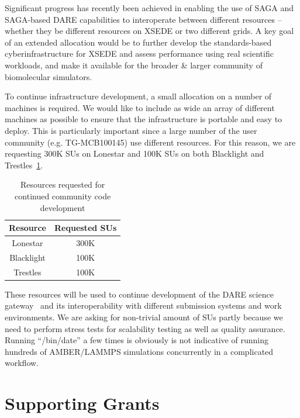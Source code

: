 \documentclass[a4paper,11pt]{article}
\newcommand{\up}{\vspace*{-1em}}
\begin{document}
Significant progress has recently been achieved in enabling the use of SAGA and SAGA-based DARE capabilities to interoperate between different resources -- whether they be different resources on XSEDE or two different grids.  A key goal of an extended allocation would be to further develop the standards-based cyberinfrastructure for XSEDE and assess performance using real scientific workloads, and make it available for the broader \& larger community of biomolecular simulators.

To continue infrastructure development, a small allocation on a number of machines is required. We would like to include as wide an array of different machines as possible to ensure that the infrastructure is portable and easy to deploy. This is particularly important since a large number of the user community (e.g. TG-MCB100145) use different resources. For this reason, we are requesting 300K SUs
 on Lonestar and 100K SUs on both Blacklight and Trestles~\ref{table:Infrastructure}.

\begin{table}[!h]
\begin{center}
\begin{tabular}{|c| c | }
\hline 
Resource & Requested SUs\\ 
\hline
Lonestar  &  300K \\
\hline
Blacklight &  100K \\
\hline
Trestles  &  100K \\
\hline
\end{tabular}
\end{center}
  \caption{\small Resources requested for continued community code development}\label{table:Infrastructure}
\up
\end{table}

These resources will be used to continue development of the DARE science gateway~\cite{dare-tg11} and its interoperability with different submission systems and work environments. We are asking for non-trivial amount of SUs partly because we need to perform stress tests for scalability testing as well as quality assurance. Running ``/bin/date'' a few times is obviously is not indicative of running hundreds of AMBER/LAMMPS simulations concurrently in a complicated workflow.


\section{Supporting Grants}
\end{document}
